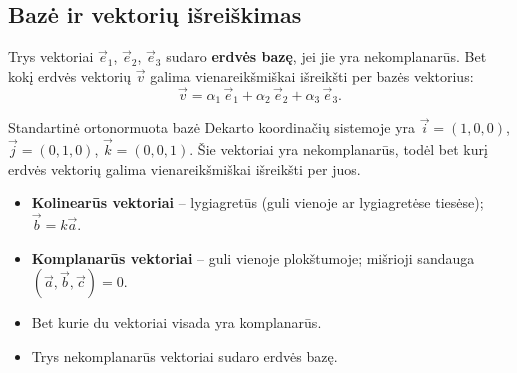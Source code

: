 \subsection{Bazė ir vektorių išreiškimas}

\begin{definition}
Trys vektoriai $\vec{e}_1$, $\vec{e}_2$, $\vec{e}_3$ sudaro \textbf{erdvės bazę}, jei jie yra nekomplanarūs. Bet kokį erdvės vektorių $\vec{v}$ galima vienareikšmiškai išreikšti per bazės vektorius:
\[
\vec{v} = \alpha_1\,\vec{e}_1 + \alpha_2\,\vec{e}_2 + \alpha_3\,\vec{e}_3.
\]
\end{definition}

Standartinė ortonormuota bazė Dekarto koordinačių sistemoje yra $\vec{i} = (1,0,0)$, $\vec{j} = (0,1,0)$, $\vec{k} = (0,0,1)$. Šie vektoriai yra nekomplanarūs, todėl bet kurį erdvės vektorių galima vienareikšmiškai išreikšti per juos.

\begin{tcolorbox}[colback=yellow!5!white, colframe=orange!80!black, title=Apibendrinimas]
\begin{itemize}
    \item \textbf{Kolinearūs vektoriai} – lygiagretūs (guli vienoje ar lygiagretėse tiesėse); $\vec{b} = k\vec{a}$.
    \item \textbf{Komplanarūs vektoriai} – guli vienoje plokštumoje; mišrioji sandauga $(\vec{a}, \vec{b}, \vec{c}) = 0$.
    \item Bet kurie du vektoriai visada yra komplanarūs.
    \item Trys nekomplanarūs vektoriai sudaro erdvės bazę.
\end{itemize}
\end{tcolorbox}

